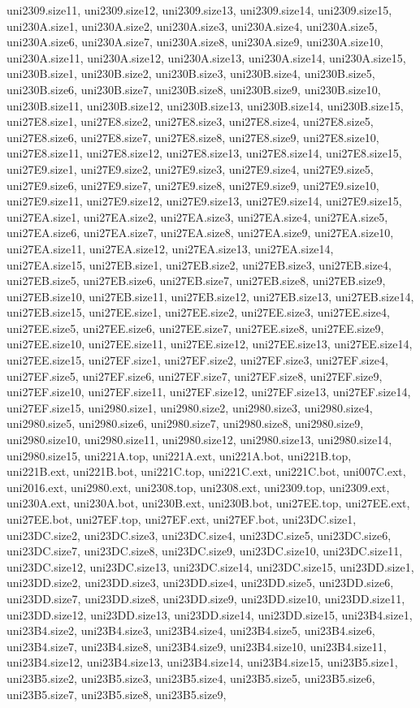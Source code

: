 uni2309.size11, uni2309.size12, uni2309.size13, uni2309.size14, uni2309.size15, uni230A.size1, uni230A.size2, uni230A.size3, uni230A.size4, uni230A.size5, uni230A.size6, uni230A.size7, uni230A.size8, uni230A.size9, uni230A.size10, uni230A.size11, uni230A.size12, uni230A.size13, uni230A.size14, uni230A.size15, uni230B.size1, uni230B.size2, uni230B.size3, uni230B.size4, uni230B.size5, uni230B.size6, uni230B.size7, uni230B.size8, uni230B.size9, uni230B.size10, uni230B.size11, uni230B.size12, uni230B.size13, uni230B.size14, uni230B.size15, uni27E8.size1, uni27E8.size2, uni27E8.size3, uni27E8.size4, uni27E8.size5, uni27E8.size6, uni27E8.size7, uni27E8.size8, uni27E8.size9, uni27E8.size10, uni27E8.size11, uni27E8.size12, uni27E8.size13, uni27E8.size14, uni27E8.size15, uni27E9.size1, uni27E9.size2, uni27E9.size3, uni27E9.size4, uni27E9.size5, uni27E9.size6, uni27E9.size7, uni27E9.size8, uni27E9.size9, uni27E9.size10, uni27E9.size11, uni27E9.size12, uni27E9.size13, uni27E9.size14, uni27E9.size15, uni27EA.size1, uni27EA.size2, uni27EA.size3, uni27EA.size4, uni27EA.size5, uni27EA.size6, uni27EA.size7, uni27EA.size8, uni27EA.size9, uni27EA.size10, uni27EA.size11, uni27EA.size12, uni27EA.size13, uni27EA.size14, uni27EA.size15, uni27EB.size1, uni27EB.size2, uni27EB.size3, uni27EB.size4, uni27EB.size5, uni27EB.size6, uni27EB.size7, uni27EB.size8, uni27EB.size9, uni27EB.size10, uni27EB.size11, uni27EB.size12, uni27EB.size13, uni27EB.size14, uni27EB.size15, uni27EE.size1, uni27EE.size2, uni27EE.size3, uni27EE.size4, uni27EE.size5, uni27EE.size6, uni27EE.size7, uni27EE.size8, uni27EE.size9, uni27EE.size10, uni27EE.size11, uni27EE.size12, uni27EE.size13, uni27EE.size14, uni27EE.size15, uni27EF.size1, uni27EF.size2, uni27EF.size3, uni27EF.size4, uni27EF.size5, uni27EF.size6, uni27EF.size7, uni27EF.size8, uni27EF.size9, uni27EF.size10, uni27EF.size11, uni27EF.size12, uni27EF.size13, uni27EF.size14, uni27EF.size15, uni2980.size1, uni2980.size2, uni2980.size3, uni2980.size4, uni2980.size5, uni2980.size6, uni2980.size7, uni2980.size8, uni2980.size9, uni2980.size10, uni2980.size11, uni2980.size12, uni2980.size13, uni2980.size14, uni2980.size15, uni221A.top, uni221A.ext, uni221A.bot, uni221B.top, uni221B.ext, uni221B.bot, uni221C.top, uni221C.ext, uni221C.bot, uni007C.ext, uni2016.ext, uni2980.ext, uni2308.top, uni2308.ext, uni2309.top, uni2309.ext, uni230A.ext, uni230A.bot, uni230B.ext, uni230B.bot, uni27EE.top, uni27EE.ext, uni27EE.bot, uni27EF.top, uni27EF.ext, uni27EF.bot, uni23DC.size1, uni23DC.size2, uni23DC.size3, uni23DC.size4, uni23DC.size5, uni23DC.size6, uni23DC.size7, uni23DC.size8, uni23DC.size9, uni23DC.size10, uni23DC.size11, uni23DC.size12, uni23DC.size13, uni23DC.size14, uni23DC.size15, uni23DD.size1, uni23DD.size2, uni23DD.size3, uni23DD.size4, uni23DD.size5, uni23DD.size6, uni23DD.size7, uni23DD.size8, uni23DD.size9, uni23DD.size10, uni23DD.size11, uni23DD.size12, uni23DD.size13, uni23DD.size14, uni23DD.size15, uni23B4.size1, uni23B4.size2, uni23B4.size3, uni23B4.size4, uni23B4.size5, uni23B4.size6, uni23B4.size7, uni23B4.size8, uni23B4.size9, uni23B4.size10, uni23B4.size11, uni23B4.size12, uni23B4.size13, uni23B4.size14, uni23B4.size15, uni23B5.size1, uni23B5.size2, uni23B5.size3, uni23B5.size4, uni23B5.size5, uni23B5.size6, uni23B5.size7, uni23B5.size8, uni23B5.size9, 